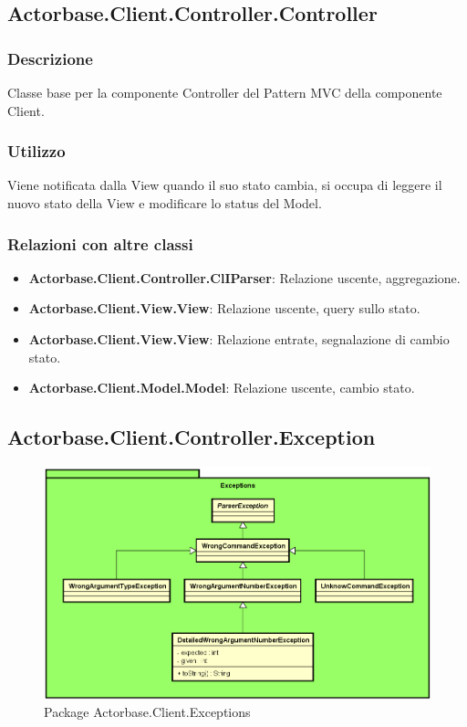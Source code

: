 \documentclass[a4paper]{article}
\begin{document}
				
		\subsection{Actorbase.Client.Controller.Controller}
			\subsubsection{Descrizione}
				Classe base per la componente Controller del Pattern MVC della componente Client.
			\subsubsection{Utilizzo}
				Viene notificata dalla View quando il suo stato cambia, si occupa di leggere il nuovo stato della View e modificare lo status del Model.
			\subsubsection{Relazioni con altre classi}
				\begin{itemize}
					\item \textbf{Actorbase.Client.Controller.ClIParser}: Relazione uscente, aggregazione.
					\item \textbf{Actorbase.Client.View.View}: Relazione uscente, query sullo stato.
					\item \textbf{Actorbase.Client.View.View}: Relazione entrate, segnalazione di cambio stato.
					\item \textbf{Actorbase.Client.Model.Model}: Relazione uscente, cambio stato.
				\end{itemize}
				
		\subsection{Actorbase.Client.Controller.Exception}
			\begin{figure} [H]
				\centering
				\includegraphics[scale=0.6]{ST/Client/ControllerExceptions.png}
   		     	\caption{Package Actorbase.Client.Exceptions}
			\end{figure}
\end{document}
